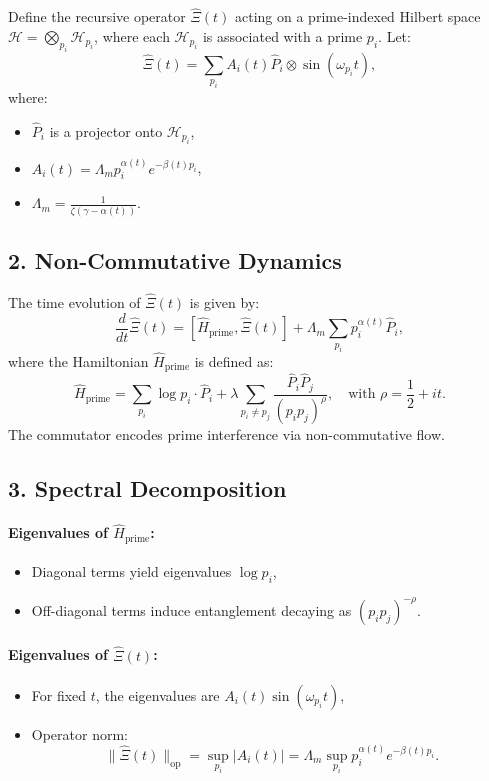 \documentclass[12pt]{article}
\theoremstyle{plain}
\begin{document}
Define the recursive operator \( \hat{\Xi}(t) \) acting on a prime-indexed Hilbert space \( \mathcal{H} = \bigotimes_{p_i} \mathcal{H}_{p_i} \), where each \( \mathcal{H}_{p_i} \) is associated with a prime \( p_i \). Let:
\[
\hat{\Xi}(t) = \sum_{p_i} A_i(t) \hat{P}_i \otimes \sin(\omega_{p_i} t),
\]
where:
\begin{itemize}
    \item \( \hat{P}_i \) is a projector onto \( \mathcal{H}_{p_i} \),
    \item \( A_i(t) = \Lambda_m p_i^{\alpha(t)} e^{-\beta(t) p_i} \),
    \item \( \Lambda_m = \frac{1}{\zeta(\gamma - \alpha(t))} \).
\end{itemize}

\subsection*{2. Non-Commutative Dynamics}

The time evolution of \( \hat{\Xi}(t) \) is given by:
\[
\frac{d}{dt} \hat{\Xi}(t) = [\hat{H}_{\text{prime}}, \hat{\Xi}(t)] + \Lambda_m \sum_{p_i} p_i^{\alpha(t)} \hat{P}_i,
\]
where the Hamiltonian \( \hat{H}_{\text{prime}} \) is defined as:
\[
\hat{H}_{\text{prime}} = \sum_{p_i} \log p_i \cdot \hat{P}_i + \lambda \sum_{p_i \neq p_j} \frac{\hat{P}_i \hat{P}_j}{(p_i p_j)^{\rho}},
\quad \text{with } \rho = \frac{1}{2} + it.
\]
The commutator encodes prime interference via non-commutative flow.

\subsection*{3. Spectral Decomposition}

\paragraph*{Eigenvalues of \( \hat{H}_{\text{prime}} \):}
\begin{itemize}
    \item Diagonal terms yield eigenvalues \( \log p_i \),
    \item Off-diagonal terms induce entanglement decaying as \( (p_i p_j)^{-\rho} \).
\end{itemize}

\paragraph*{Eigenvalues of \( \hat{\Xi}(t) \):}
\begin{itemize}
    \item For fixed \( t \), the eigenvalues are \( A_i(t) \sin(\omega_{p_i} t) \),
    \item Operator norm:
    \[
    \| \hat{\Xi}(t) \|_{\text{op}} = \sup_{p_i} |A_i(t)| = \Lambda_m \sup_{p_i} p_i^{\alpha(t)} e^{-\beta(t) p_i}.
    \]
\end{itemize}
\end{document}
